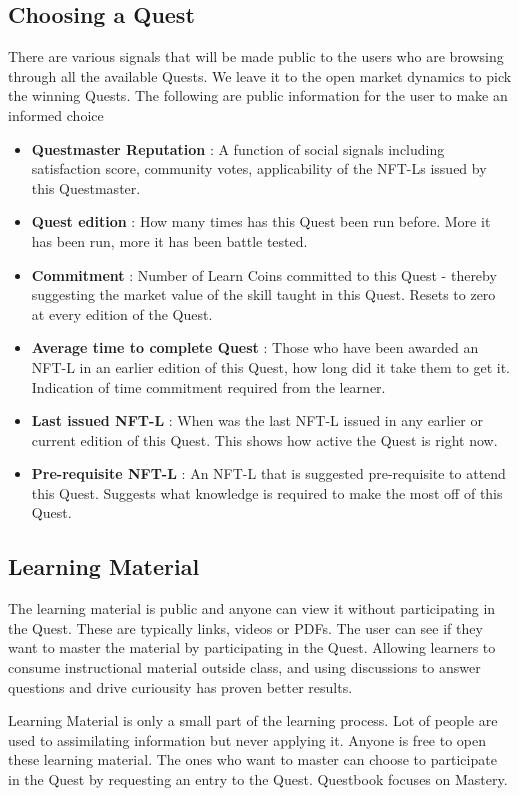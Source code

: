 \documentclass{article}
\begin{document}
    \subsection{Choosing a Quest}
        There are various signals that will be made public to the users who are browsing through all the available Quests. We leave it to the open market dynamics to pick the winning Quests.
        The following are public information for the user to make an informed choice
        \begin{itemize}
          \item \textbf{Questmaster Reputation }: A function of social signals including satisfaction score, community votes, applicability of the NFT-Ls issued by this Questmaster.
          \item \textbf{Quest edition }: How many times has this Quest been run before. More it has been run, more it has been battle tested.
          \item \textbf{Commitment }: Number of Learn Coins committed to this Quest - thereby suggesting the market value of the skill taught in this Quest. Resets to zero at every edition of the Quest.
          \item \textbf{Average time to complete Quest }: Those who have been awarded an NFT-L in an earlier edition of this Quest, how long did it take them to get it. Indication of time commitment required from the learner. 
          \item \textbf{Last issued NFT-L }:  When was the last NFT-L issued in any earlier or current edition of this Quest. This shows how active the Quest is right now. 
          \item \textbf{Pre-requisite NFT-L }: An NFT-L that is suggested pre-requisite to attend this Quest. Suggests what knowledge is required to make the most off of this Quest.
        \end{itemize}
    \subsection{Learning Material}
        The learning material is public and anyone can view it without participating in the Quest. 
        These are typically links, videos or PDFs. The user can see if they want to master the material by participating in the Quest. 
        Allowing learners to consume instructional material outside class, and using discussions to answer questions and drive curiousity has proven better results. %
        \par
        Learning Material is only a small part of the learning process. Lot of people are used to assimilating information but never applying it. 
        Anyone is free to open these learning material. 
        The ones who want to master can choose to participate in the Quest by requesting an entry to the Quest.
        Questbook focuses on Mastery. %
\end{document}
